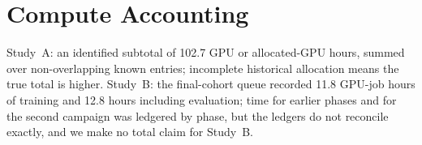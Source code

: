 \documentclass[journal]{IEEEtran}
\begin{document}
\section{Compute Accounting}
\label{app:compute}
Study~A: an identified subtotal of 102.7 GPU or allocated-GPU hours, summed over non-overlapping known entries; incomplete historical allocation means the true total is higher. Study~B: the final-cohort queue recorded 11.8 GPU-job hours of training and 12.8 hours including evaluation; time for earlier phases and for the second campaign was ledgered by phase, but the ledgers do not reconcile exactly, and we make no total claim for Study~B.

\FloatBarrier


\end{document}
